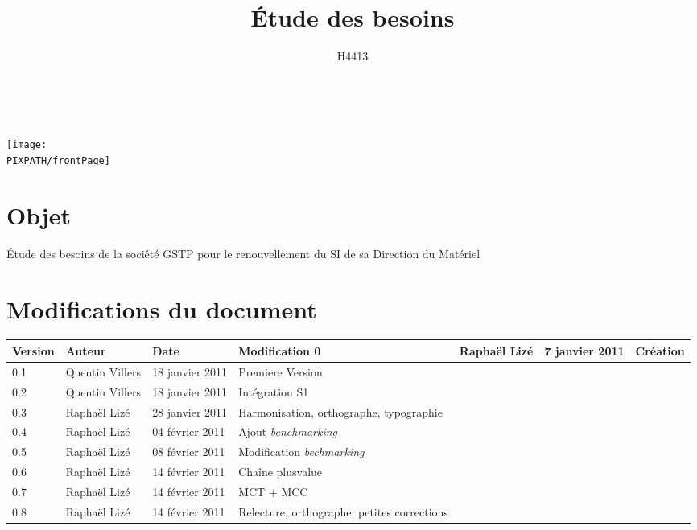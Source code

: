 \documentclass[twoside]{article}
\title{Étude des besoins}
\author{H4413}
\newcommand\PIXPATH{./docs/pics}
\newcommand\Object{Étude des besoins de la société GSTP pour le renouvellement du SI de sa Direction du Matériel}
\begin{document}



\maketitle

\thispagestyle{empty}

\hfill\\
\vfill


\begin{center}
    \texttt{[image: \\PIXPATH/frontPage]}
\end{center}

\section*{Objet}
\Object



\section*{Modifications du document}

\begin{center}
\begin{longtable}{|m{14mm}|m{36mm}|m{36mm}|m{60mm}|}
\hline
Version & Auteur & Date & Modification\endhead \hline
0
& %
Raphaël Lizé
& %
7 janvier 2011
& %
Création
\\\hline
0.1
& %
Quentin Villers
& %
18 janvier 2011
& %
Premiere Version
\\\hline
0.2
& %
Quentin Villers
& %
18 janvier 2011
& %
Intégration S1
\\\hline
0.3
& %
Raphaël Lizé
& %
28 janvier 2011
& %
Harmonisation, orthographe, typographie
\\\hline
0.4
& %
Raphaël Lizé
& %
04 février 2011
& %
Ajout {\sl benchmarking}
\\\hline
0.5
& %
Raphaël Lizé
& %
08 février 2011
& %
Modification {\sl bechmarking}
\\\hline
0.6
& %
Raphaël Lizé
& %
14 février 2011
& %
Chaîne plusvalue
\\\hline
0.7
& %
Raphaël Lizé
& %
14 février 2011
& %
MCT + MCC
\\\hline
0.8
& %
Raphaël Lizé
& %
14 février 2011
& %
Relecture, orthographe, petites corrections
\\\hline

\end{longtable}
\end{center}
\end{document}
